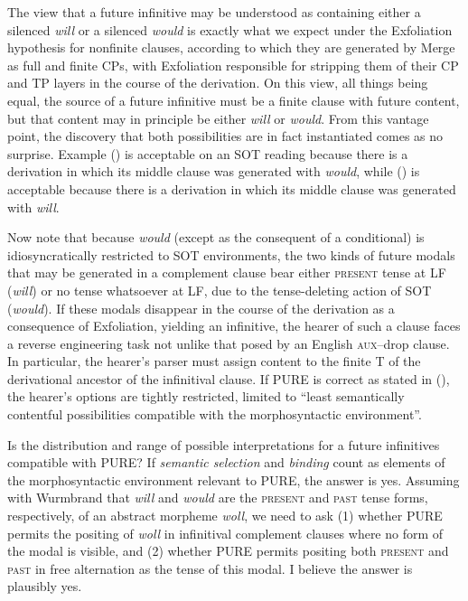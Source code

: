 \documentclass[output=paper]{langscibook}
\begin{document}
The view that a future infinitive may be understood as containing either a silenced \textit{will }or a silenced \textit{would }is exactly what we expect under the Exfoliation hypothesis for nonfinite clauses, according to which they are generated by Merge as full and finite CPs, with Exfoliation responsible for stripping them of their CP and TP layers in the course of the derivation. On this view, all things being equal, the source of a future infinitive must be a finite clause with future content, but that content may in principle be either \textit{will }or \textit{would}. From this vantage point, the discovery that both possibilities are in fact instantiated comes as no surprise. Example () is acceptable on an SOT reading because there is a derivation in which its middle clause was generated with \textit{would}, while () is acceptable because there is a derivation in which its middle clause was generated with \textit{will}.

Now note that because \textit{would} (except as the consequent of a conditional) is idiosyncratically restricted to SOT environments, the two kinds of future modals that may be generated in a complement clause bear either \textsc{present} tense at LF (\textit{will}) or no tense whatsoever at LF, due to the tense-deleting action of SOT (\textit{would}). If these modals disappear in the course of the derivation as a consequence of Exfoliation, yielding an infinitive, the hearer of such a clause faces a reverse engineering task not unlike that posed by an English \textsc{aux}--drop clause. In particular, the hearer's parser must assign content to the finite T of the derivational ancestor of the infinitival clause. If PURE is correct as stated in (), the hearer's options are tightly restricted, limited to “least semantically contentful possibilities compatible with the morphosyntactic environment”. 

Is the distribution and range of possible interpretations for a future infinitives compatible with PURE? If \textit{semantic selection} and \textit{binding} count as elements of the morphosyntactic environment relevant to PURE, the answer is yes. Assuming with Wurmbrand that \textit{will} and \textit{would} are the \textsc{present }and \textsc{past} tense forms, respectively, of an abstract morpheme \textit{woll}, we need to ask (1) whether PURE permits the positing of \textit{woll} in infinitival complement clauses where no form of the modal is visible, and (2) whether PURE permits positing both \textsc{present} and \textsc{past }in free alternation as the tense of this modal. I believe the answer is plausibly yes. 
\end{document}
